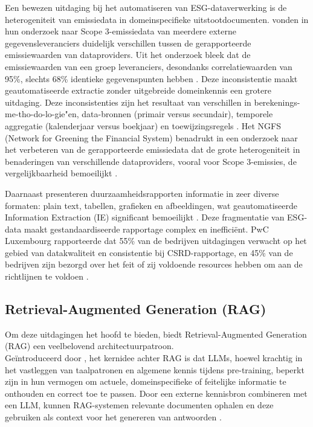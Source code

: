 Een bewezen uitdaging bij het automatiseren van ESG-dataverwerking is de heterogeniteit van emissiedata in domeinspecifieke uitstootdocumenten. \textcite{Nguyen2023} vonden in hun onderzoek naar Scope 3-emissiedata van meerdere externe gegevensleveranciers duidelijk verschillen tussen de gerapporteerde emissiewaarden van dataproviders. Uit het onderzoek bleek dat de emissiewaarden van een groep leveranciers, desondanks correlatiewaarden van 95\%, slechts 68\% identieke gegevenspunten hebben \autocite{Nguyen2023}. Deze inconsistentie maakt geautomatiseerde extractie zonder uitgebreide domeinkennis een grotere uitdaging. Deze inconsistenties zijn het resultaat van verschillen in berekenings-me-tho-do-lo-gie"en, data-bronnen (primair versus secundair), temporele aggregatie (kalenderjaar versus boekjaar) en toewijzingsregels \autocite{Nguyen2023}. Het NGFS (Network for Greening the Financial System) benadrukt in een onderzoek naar het verbeteren van de gerapporteerde emissiedata dat de grote heterogeniteit in benaderingen van verschillende dataproviders, vooral voor Scope 3-emissies, de vergelijkbaarheid bemoeilijkt \autocite{NGFS2024}.

Daarnaast presenteren duurzaamheidsrapporten informatie in zeer diverse formaten: plain text, tabellen, grafieken en afbeeldingen, wat geautomatiseerde Information Extraction (IE) significant bemoeilijkt \autocite{Morales2022}. Deze fragmentatie van ESG-data maakt gestandaardiseerde rapportage complex en ineffici\"ent. PwC Luxembourg rapporteerde dat 55\% van de bedrijven uitdagingen verwacht op het gebied van datakwaliteit en consistentie bij CSRD-rapportage, en 45\% van de bedrijven zijn bezorgd over het feit of zij voldoende resources hebben om aan de richtlijnen te voldoen \autocite{FundsEurope2025}.

\subsection{Retrieval-Augmented Generation (RAG)}

Om deze uitdagingen het hoofd te bieden, biedt Retrieval-Augmented Generation (RAG) een veelbelovend architectuurpatroon.\\Geïntroduceerd door \autocite{Lewis2020}, het kernidee achter RAG is dat LLMs, hoewel krachtig in het vastleggen van taalpatronen en algemene kennis tijdens pre-training, beperkt zijn in hun vermogen om actuele, domeinspecifieke of feitelijke informatie te onthouden en correct toe te passen. Door een externe kennisbron combineren met een LLM, kunnen RAG-systemen relevante documenten ophalen en deze gebruiken als context voor het genereren van antwoorden \autocite{Lewis2020}.

